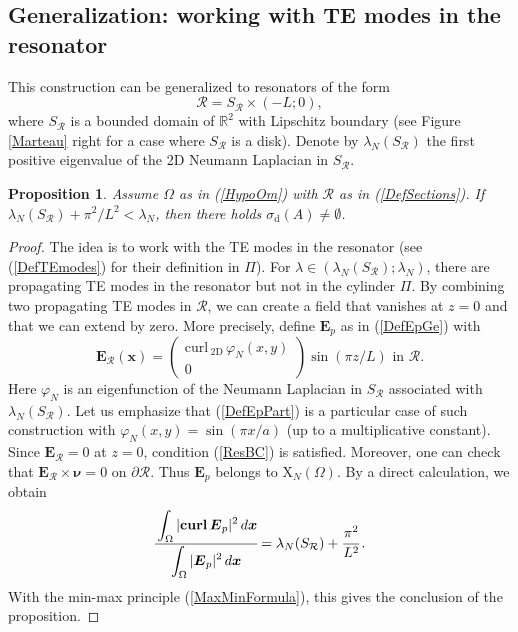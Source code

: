 \documentclass[11pt,a4paper]{article}
\newcommand{\dsp}{\displaystyle}
\newcommand{\Om}{\Omega}
\newcommand{\mrm}[1]{\mathrm{#1}}
\newcommand{\bfx}{\boldsymbol{x}}
\newcommand{\bfnu}{\boldsymbol{\nu}}
\newcommand{\R}{\mathbb{R}}
\newcommand{\mX}{\mrm{X}}
\newcommand{\curlvec}{\boldsymbol{\mrm{curl}}\,}
\def\E{\boldsymbol{E}}
\newtheorem{proposition}[theorem]{Proposition}
\begin{document}
\subsection{Generalization: working with TE modes in the resonator}\label{paraGene}





\noindent This construction can be generalized to resonators of the form 
\begin{equation}\label{DefSections}
\mathcal{R}=S_{\mathcal{R}}\times(-L;0),
\end{equation}
where $S_{\mathcal{R}}$ is a bounded domain of $\R^2$ with Lipschitz boundary (see Figure \ref{Marteau} right for a case where $S_{\mathcal{R}}$ is a disk). Denote by $\lambda_N(S_{\mathcal{R}})$ the first positive eigenvalue of the 2D Neumann Laplacian in $S_{\mathcal{R}}$. 
\begin{proposition}\label{PropoTMmodes}
Assume $\Om$ as in (\ref{HypoOm}) with $\mathcal{R}$ as in (\ref{DefSections}). If $\lambda_N(S_{\mathcal{R}})+\pi^2/L^2<\lambda_N$, then there holds $\sigma_{\mrm{d}}(A)\ne\emptyset$. 
\end{proposition}
\begin{proof}
The idea is to work with the TE modes in the resonator (see (\ref{DefTEmodes}) for their definition in $\Pi$). For $\lambda\in(\lambda_N(S_{\mathcal{R}});\lambda_N)$, there are propagating TE modes in the resonator but not in the cylinder $\Pi$. By combining two propagating TE modes in $\mathcal{R}$, we can create a field that vanishes at $z=0$ and that we can extend by zero. More precisely, define $\E_{p}$ as in (\ref{DefEpGe}) with
\begin{equation}\label{DefEModeTEbis}
\E_{\mathcal{R}}(\bfx)= \left(\begin{array}{c}
\curlvec_{\mrm{2D}}\,\varphi_N(x,y)\\
0
\end{array}\right)\sin(\pi z/L)
\mbox{ in }\mathcal{R}.
\end{equation}
Here $\varphi_N$ is an eigenfunction of the Neumann Laplacian in $S_{\mathcal{R}}$ associated with $\lambda_N(S_{\mathcal{R}})$. Let us emphasize that (\ref{DefEpPart}) is a particular case of such construction with $\varphi_N(x,y)=\sin(\pi x/a)$ (up to a multiplicative constant). Since $\E_{\mathcal{R}}=0$ at $z=0$, condition (\ref{ResBC}) is satisfied. Moreover, one can check that $\E_{\mathcal{R}}\times\bfnu=0$ on $\partial\mathcal{R}$. Thus $\E_{p}$ belongs to $\boldsymbol{\mX}_N(\Om)$. By a direct calculation, we obtain
\[
\cfrac{\dsp\int_{\Om}|\curlvec\E_{p}|^2\,d\bfx}{\dsp\int_{\Om}|\E_{p}|^2\,d\bfx}=\lambda_N(S_{\mathcal{R}})+\cfrac{\pi^2}{L^2}\,.
\]
With the min-max principle (\ref{MaxMinFormula}), this gives the conclusion of the proposition.
\end{proof}
\end{document}
